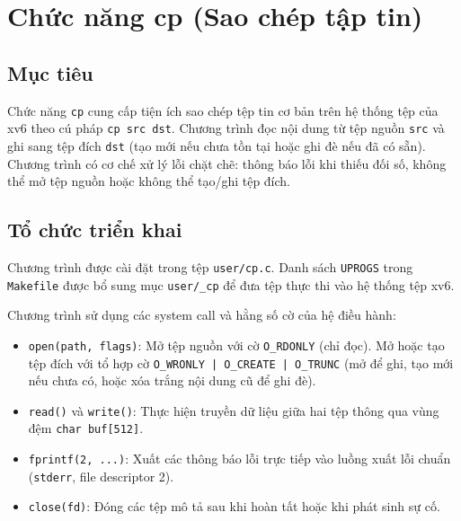 \section{Chức năng cp (Sao chép tập tin)}

\subsection{Mục tiêu}
Chức năng \texttt{cp} cung cấp tiện ích sao chép tệp tin cơ bản trên hệ thống tệp của xv6 theo cú pháp \texttt{cp src dst}. Chương trình đọc nội dung từ tệp nguồn \texttt{src} và ghi sang tệp đích \texttt{dst} (tạo mới nếu chưa tồn tại hoặc ghi đè nếu đã có sẵn). Chương trình có cơ chế xử lý lỗi chặt chẽ: thông báo lỗi khi thiếu đối số, không thể mở tệp nguồn hoặc không thể tạo/ghi tệp đích.

\subsection{Tổ chức triển khai}
Chương trình được cài đặt trong tệp \texttt{user/cp.c}. Danh sách \texttt{UPROGS} trong \texttt{Makefile} được bổ sung mục \texttt{user/\_cp} để đưa tệp thực thi vào hệ thống tệp xv6.

Chương trình sử dụng các system call và hằng số cờ của hệ điều hành:
\begin{itemize}
  \item \texttt{open(path, flags)}: Mở tệp nguồn với cờ \texttt{O\_RDONLY} (chỉ đọc). Mở hoặc tạo tệp đích với tổ hợp cờ \texttt{O\_WRONLY | O\_CREATE | O\_TRUNC} (mở để ghi, tạo mới nếu chưa có, hoặc xóa trắng nội dung cũ để ghi đè).
  \item \texttt{read()} và \texttt{write()}: Thực hiện truyền dữ liệu giữa hai tệp thông qua vùng đệm \texttt{char buf[512]}.
  \item \texttt{fprintf(2, ...)}: Xuất các thông báo lỗi trực tiếp vào luồng xuất lỗi chuẩn (\texttt{stderr}, file descriptor 2).
  \item \texttt{close(fd)}: Đóng các tệp mô tả sau khi hoàn tất hoặc khi phát sinh sự cố.
\end{itemize}

